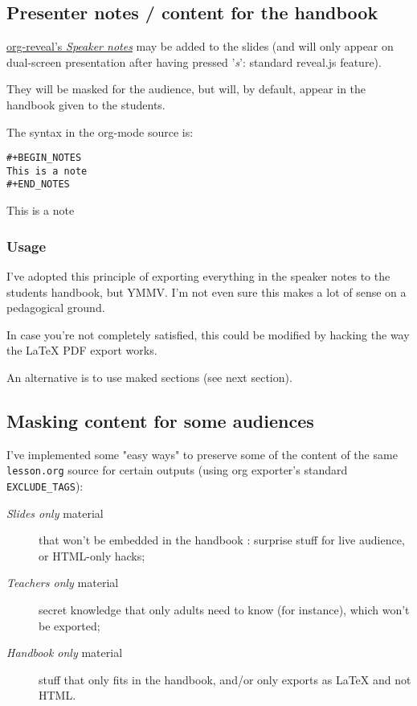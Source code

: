\documentclass[a4paper]{article}
\newenvironment{NOTES}{\begin{lrbox}{\mybox}\begin{minipage}{0.9\textwidth}\begin{shaded}}{\end{shaded}\end{minipage}\end{lrbox}\fbox{\usebox{\mybox}}}
\begin{document}
\subsection{Presenter notes / content for the handbook}
\label{sec:org040fdb2}

\href{https://github.com/yjwen/org-reveal/\#speaker-notes}{org-reveal's \emph{Speaker notes}} may be added to the slides (and will only appear on
dual-screen presentation after having pressed '\emph{s}': standard reveal.js
feature).

They will be masked for the audience, but will, by default, appear in the handbook given to the students.

The syntax in the org-mode source is:
\begin{verbatim}
#+BEGIN_NOTES
This is a note
#+END_NOTES
\end{verbatim}

\begin{NOTES}
This is a note
\end{NOTES}

\subsubsection{Usage}
\label{sec:org63f29fc}

I've adopted this principle of exporting everything in the speaker
notes to the students handbook, but YMMV. I'm not even sure this makes
a lot of sense on a pedagogical ground.

In case you're not completely satisfied, this could be modified by
hacking the way the \LaTeX{} PDF export works.

An alternative is to use maked sections (see next section).

\subsection{Masking content for some audiences}
\label{sec:orgbe9ada6}

I've implemented some "easy ways" to preserve some of the content of the same \texttt{lesson.org} source for certain outputs (using org exporter's standard \texttt{EXCLUDE\_TAGS}):

\begin{description}
\item[{\emph{Slides only} material}] that won't be embedded in the handbook : surprise stuff for live audience, or HTML-only hacks;
\item[{\emph{Teachers only} material}] secret knowledge that only adults need
to know (for instance), which won't be exported;
\end{description}
\begin{description}
\item[{\emph{Handbook only} material}] stuff that only fits in the handbook, and/or only exports as \LaTeX{} and not HTML.
\end{description}
\end{document}
